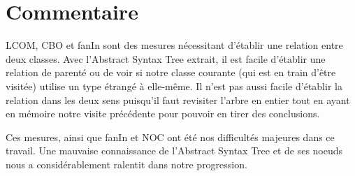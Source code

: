 \documentclass[11pt, french]{article} %
\begin{document}
\section{Commentaire}
LCOM, CBO et fanIn sont des mesures nécessitant d'établir une relation entre deux classes. Avec l'Abstract Syntax Tree extrait, il est facile d'établir une relation de parenté ou de voir si notre classe courante (qui est en train d'être visitée) utilise un type étrangé à elle-même. Il n'est pas aussi facile d'établir la relation dans les deux sens puisqu'il faut revisiter l'arbre en entier tout en ayant en mémoire notre visite précédente pour pouvoir en tirer des conclusions.

Ces mesures, ainsi que fanIn et NOC ont été nos difficultés majeures dans ce travail. Une mauvaise connaissance de l'Abstract Syntax Tree et de ses noeuds nous a considérablement ralentit dans notre progression.
\end{document}
